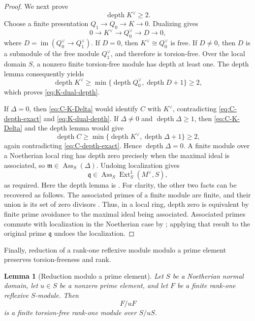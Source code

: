 \documentclass[reqno]{amsart}
\theoremstyle{plain}
\newtheorem{lemma}[theorem]{Lemma}
\theoremstyle{definition}
\newcommand{\Ass}{\operatorname{Ass}}
\newcommand{\depth}{\operatorname{depth}}
\newcommand{\Ext}{\operatorname{Ext}}
\begin{document}
\begin{proof}
We next prove
\begin{equation}
\label{eq:K-dual-depth}
 \depth K^\vee\geq2.
\end{equation}
Choose a finite presentation $Q_1\to Q_0\to K\to0$.  Dualizing gives
\[
 0\longrightarrow K^\vee\longrightarrow Q_0^\vee
 \longrightarrow D\longrightarrow0,
\]
where $D=\operatorname{im}(Q_0^\vee\to Q_1^\vee)$.  If $D=0$, then
$K^\vee\cong Q_0^\vee$ is free.  If $D\neq0$, then $D$ is a submodule
of the free module $Q_1^\vee$, and therefore is torsion-free.  Over the
local domain $S$, a nonzero finite torsion-free module has depth at least
one.  The depth lemma consequently yields
\[
 \depth K^\vee
 \geq\min\{\depth Q_0^\vee,\depth D+1\}
 \geq2,
\]
which proves \eqref{eq:K-dual-depth}.

If $\Delta=0$, then \eqref{eq:C-K-Delta} would identify $C$ with
$K^\vee$, contradicting \eqref{eq:C-depth-exact} and
\eqref{eq:K-dual-depth}.  If $\Delta\neq0$ and
$\depth\Delta\geq1$, then \eqref{eq:C-K-Delta} and the depth lemma would
give
\[
 \depth C\geq
 \min\{\depth K^\vee,\depth\Delta+1\}\geq2,
\]
again contradicting \eqref{eq:C-depth-exact}.  Hence
$\depth\Delta=0$.  A finite module over a Noetherian local ring has depth
zero precisely when the maximal ideal is associated, so
$\mathfrak m\in\Ass_S(\Delta)$.  Undoing localization gives
\[
 \mathfrak q\in\Ass_S\Ext^1_S(M^\vee,S),
\]
as required.  Here the depth lemma is
\cite[Proposition~1.2.9]{BrunsHerzog}.  For clarity, the other two facts can
be recovered as follows.  The associated primes of a finite module are
finite, and their union is its set of zero divisors
\cite[Chapter~IV, \S1, no.~1, Corollary~2 to Proposition~2, and no.~4,
Theorems~1--2 and Corollary]{BourbakiCA}.  Thus, in a local ring, depth zero
is equivalent by finite prime avoidance to the maximal ideal being
associated.  Associated primes commute with localization in the Noetherian
case by \cite[Chapter~IV, \S1, no.~2, Proposition~5 and its
Corollary]{BourbakiCA}; applying that result to the original prime
$\mathfrak q$ undoes the localization.
\end{proof}

Finally, reduction of a rank-one reflexive module modulo a prime element
preserves torsion-freeness and rank.

\begin{lemma}[Reduction modulo a prime element]
\label{lem:torsion-free-section}
Let $S$ be a Noetherian normal domain, let $u\in S$ be a nonzero prime
element, and let $F$ be a finite rank-one reflexive $S$-module.  Then
\[
 F/uF
\]
is a finite torsion-free rank-one module over $S/uS$.
\end{lemma}
\end{document}
